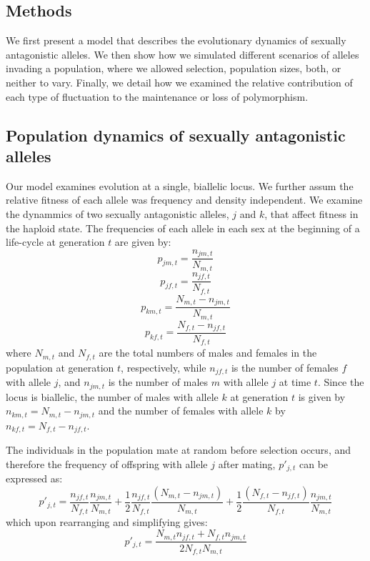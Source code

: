 \begin{refsection}
\section*{Methods}

We first present a model that describes the evolutionary dynamics of sexually antagonistic alleles. We then show how we simulated different scenarios of alleles invading a population, where we allowed selection, population sizes, both, or neither to vary. Finally, we detail how we examined the relative contribution of each type of fluctuation to the maintenance or loss of polymorphism.

\subsection*{Population dynamics of sexually antagonistic alleles}


Our model examines evolution at a single, biallelic locus. We further assum the relative fitness of each allele was frequency and density independent. We examine the dynammics of two  sexually antagonistic alleles, $j$ and $k$, that affect fitness in the haploid state. The frequencies of each allele in each sex at the beginning of a life-cycle at generation $t$ are given by:
\begin{equation}
    p_{jm,t}= \frac{n_{jm,t}}{N_{m,t}}
    \label{first_pop}
\end{equation}
\begin{equation}
    p_{jf,t}= \frac{n_{jf,t}}{N_{f,t}}
\end{equation}
\begin{equation}
    p_{km,t}=  \frac{N_{m,t}-n_{jm,t}}{N_{m,t}}
\end{equation}
\begin{equation}
    p_{kf,t}= \frac{N_{f,t}-n_{jf,t}}{N_{f,t}}
\end{equation}
where $N_{m,t}$ and $N_{f,t}$ are the total numbers of males and females in the population at generation $t$, respectively, while $n_{jf,t}$ is the number of females $f$ with allele $j$, and $n_{jm,t}$ is the number of males $m$ with allele $j$ at time $t$. Since the locus is biallelic, the number of males with allele $k$ at generation $t$ is given by $n_{km,t}=N_{m,t}-n_{jm,t}$ and the number of females with allele $k$ by $n_{kf,t}=N_{f,t}-n_{jf,t}$.

The individuals in the population mate at random before selection occurs, and therefore the frequency of offspring with allele $j$ after mating, $p'_{j,t}$ can be expressed as:
\begin{equation}
   p'_{j,t}= \frac{n_{jf,t}}{N_{f,t}} \frac{n_{jm,t}}{N_{m,t}} + \frac{1}{2} \frac{n_{jf,t}}{N_{f,t}} \frac{(N_{m,t}-n_{jm,t})}{N_{m,t}} +\frac{1}{2}
   \frac{(N_{f,t}-n_{jf,t})}{N_{f,t}} \frac{n_{jm,t}}{N_{m,t}}
   \label{prime_a}
\end{equation}
which upon rearranging and simplifying gives:
\begin{equation}
   p'_{j,t}= \frac{N_{m,t}n_{jf,t}+ N_{f,t}n_{jm,t}}{2 N_{f,t}N_{m,t}}
   \label{pprime}
\end{equation}


\end{refsection}
